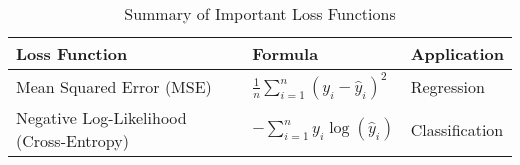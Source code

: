 \begin{table}[htb!]
\caption{Summary of Important Loss Functions}
\label{Tables:LossFunctions}
\centering
\footnotesize
\begin{tabularx}{\textwidth}{@{}lXl@{}}
\toprule
\textbf{Loss Function} & \textbf{Formula} & \textbf{Application} \\
\midrule
Mean Squared Error (MSE) & \( \frac{1}{n} \sum_{i=1}^n (y_i - \hat{y}_i)^2 \) & Regression \\
\addlinespace
Negative Log-Likelihood (Cross-Entropy) & \( -\sum_{i=1}^n y_i \log(\hat{y}_i) \) & Classification \\
\bottomrule
\end{tabularx}
\end{table}
